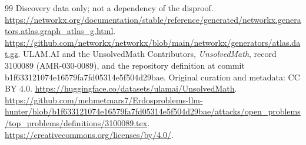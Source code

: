 \documentclass[11pt]{article}
\begin{document}
\begin{thebibliography}{99}
Discovery data only; not a dependency of the disproof.
\url{https://networkx.org/documentation/stable/reference/generated/networkx.generators.atlas.graph_atlas_g.html}.
\url{https://github.com/networkx/networkx/blob/main/networkx/generators/atlas.dat.gz}.
 ULAM.AI and the UnsolvedMath Contributors,
\emph{UnsolvedMath}, record 3100089 (AMR-030-0089), and the repository
definition at commit b1f633121074e16579fa7fd05314e5f504d29bae.
Original curation and metadata: CC BY 4.0.
\url{https://huggingface.co/datasets/ulamai/UnsolvedMath}.
\url{https://github.com/mehmetmars7/Erdosproblems-llm-hunter/blob/b1f633121074e16579fa7fd05314e5f504d29bae/attacks/open_problems/top_problems/definitions/3100089.tex}.
\url{https://creativecommons.org/licenses/by/4.0/}.
\end{thebibliography}
\end{document}
